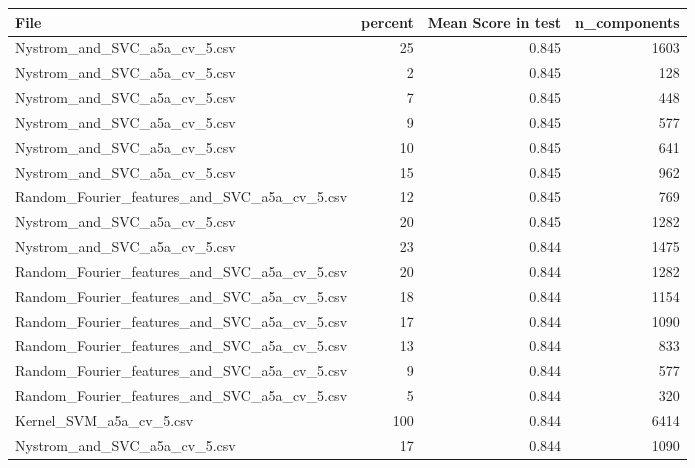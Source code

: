 \begin{tabularx}{\textwidth}{lrrr}
\toprule
                                        File &  percent &  Mean Score in test &  n\_components \\
\midrule
                Nystrom\_and\_SVC\_a5a\_cv\_5.csv &       25 &               0.845 &          1603 \\
                Nystrom\_and\_SVC\_a5a\_cv\_5.csv &        2 &               0.845 &           128 \\
                Nystrom\_and\_SVC\_a5a\_cv\_5.csv &        7 &               0.845 &           448 \\
                Nystrom\_and\_SVC\_a5a\_cv\_5.csv &        9 &               0.845 &           577 \\
                Nystrom\_and\_SVC\_a5a\_cv\_5.csv &       10 &               0.845 &           641 \\
                Nystrom\_and\_SVC\_a5a\_cv\_5.csv &       15 &               0.845 &           962 \\
Random\_Fourier\_features\_and\_SVC\_a5a\_cv\_5.csv &       12 &               0.845 &           769 \\
                Nystrom\_and\_SVC\_a5a\_cv\_5.csv &       20 &               0.845 &          1282 \\
                Nystrom\_and\_SVC\_a5a\_cv\_5.csv &       23 &               0.844 &          1475 \\
Random\_Fourier\_features\_and\_SVC\_a5a\_cv\_5.csv &       20 &               0.844 &          1282 \\
Random\_Fourier\_features\_and\_SVC\_a5a\_cv\_5.csv &       18 &               0.844 &          1154 \\
Random\_Fourier\_features\_and\_SVC\_a5a\_cv\_5.csv &       17 &               0.844 &          1090 \\
Random\_Fourier\_features\_and\_SVC\_a5a\_cv\_5.csv &       13 &               0.844 &           833 \\
Random\_Fourier\_features\_and\_SVC\_a5a\_cv\_5.csv &        9 &               0.844 &           577 \\
Random\_Fourier\_features\_and\_SVC\_a5a\_cv\_5.csv &        5 &               0.844 &           320 \\
                     Kernel\_SVM\_a5a\_cv\_5.csv &      100 &               0.844 &          6414 \\
                Nystrom\_and\_SVC\_a5a\_cv\_5.csv &       17 &               0.844 &          1090 \\

\end{tabularx}
